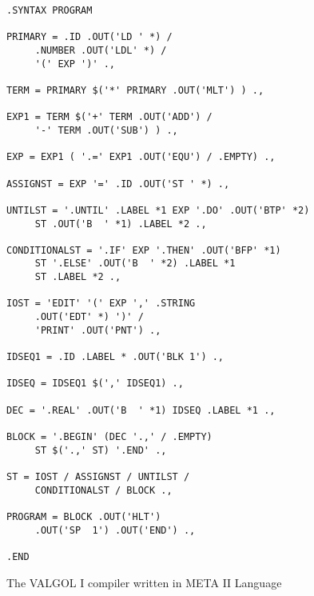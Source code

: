 \documentclass[notitlepage,twocolumn]{report}
\begin{document}
\begin{figure}
  \caption{The VALGOL I compiler written in META II Language}
\begin{verbatim}
.SYNTAX PROGRAM

PRIMARY = .ID .OUT('LD ' *) /
     .NUMBER .OUT('LDL' *) /
     '(' EXP ')' .,

TERM = PRIMARY $('*' PRIMARY .OUT('MLT') ) .,

EXP1 = TERM $('+' TERM .OUT('ADD') /
     '-' TERM .OUT('SUB') ) .,

EXP = EXP1 ( '.=' EXP1 .OUT('EQU') / .EMPTY) .,

ASSIGNST = EXP '=' .ID .OUT('ST ' *) .,

UNTILST = '.UNTIL' .LABEL *1 EXP '.DO' .OUT('BTP' *2)
     ST .OUT('B  ' *1) .LABEL *2 .,

CONDITIONALST = '.IF' EXP '.THEN' .OUT('BFP' *1)
     ST '.ELSE' .OUT('B  ' *2) .LABEL *1
     ST .LABEL *2 .,

IOST = 'EDIT' '(' EXP ',' .STRING
     .OUT('EDT' *) ')' /
     'PRINT' .OUT('PNT') .,

IDSEQ1 = .ID .LABEL * .OUT('BLK 1') .,

IDSEQ = IDSEQ1 $(',' IDSEQ1) .,

DEC = '.REAL' .OUT('B  ' *1) IDSEQ .LABEL *1 .,

BLOCK = '.BEGIN' (DEC '.,' / .EMPTY)
     ST $('.,' ST) '.END' .,

ST = IOST / ASSIGNST / UNTILST /
     CONDITIONALST / BLOCK .,

PROGRAM = BLOCK .OUT('HLT')
     .OUT('SP  1') .OUT('END') .,

.END
\end{verbatim}
\end{figure}
\end{document}
